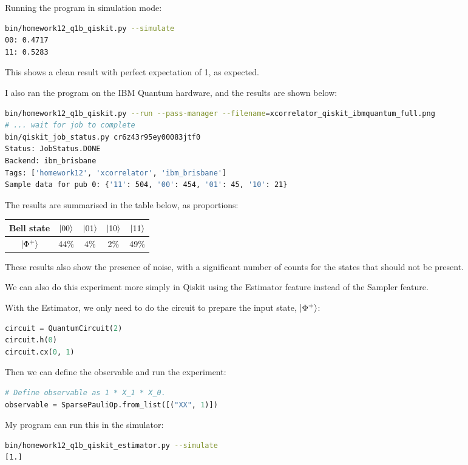 \documentclass[12pt]{extarticle}
\begin{document}
\begin{enumerate}[(a)]
Running the program in simulation mode:

\begin{lstlisting}[language=bash]
bin/homework12_q1b_qiskit.py --simulate
00: 0.4717
11: 0.5283
\end{lstlisting}

This shows a clean result with perfect expectation of 1, as expected.

I also ran the program on the IBM Quantum hardware, and the results are shown below:

\begin{lstlisting}[language=bash]
bin/homework12_q1b_qiskit.py --run --pass-manager --filename=xcorrelator_qiskit_ibmquantum_full.png
# ... wait for job to complete
bin/qiskit_job_status.py cr6z43r95ey00083jtf0
Status: JobStatus.DONE
Backend: ibm_brisbane
Tags: ['homework12', 'xcorrelator', 'ibm_brisbane']
Sample data for pub 0: {'11': 504, '00': 454, '01': 45, '10': 21}
\end{lstlisting}

The results are summarised in the table below, as proportions:

\begin{center}
\begin{tabular}{|c|c|c|c|c|}
\hline
Bell state & $\ket{00}$ & $\ket{01}$ & $\ket{10}$ & $\ket{11}$ \\
\hline
$\ket{\Phi^{+}}$ & 44\% &  4\% &  2\% & 49\% \\
\hline
\end{tabular}
\end{center}

These results also show the presence of noise, with a significant number of counts for the states that should not be present.

We can also do this experiment more simply in Qiskit using the Estimator feature instead of the Sampler feature.

With the Estimator, we only need to do the circuit to prepare the input state, $\ket{\Phi^{+}}$:
\begin{lstlisting}[language=python]
circuit = QuantumCircuit(2)
circuit.h(0)
circuit.cx(0, 1)
\end{lstlisting}
Then we can define the observable and run the experiment:
\begin{lstlisting}[language=python]
# Define observable as 1 * X_1 * X_0.
observable = SparsePauliOp.from_list([("XX", 1)])
\end{lstlisting}

My program can run this in the simulator:
\begin{lstlisting}[language=bash]
bin/homework12_q1b_qiskit_estimator.py --simulate
[1.]
\end{lstlisting}


\end{enumerate}
\end{document}
